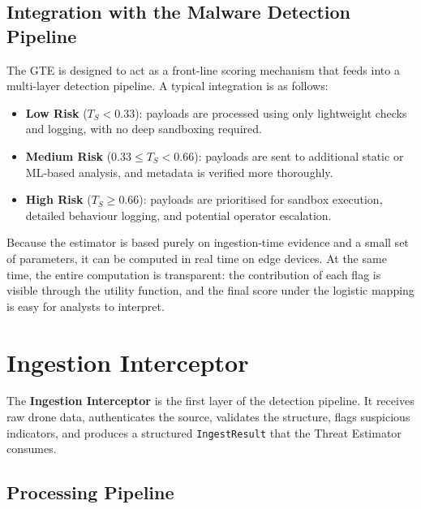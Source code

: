 \documentclass[12pt, a4paper]{report}
\begin{document}
\section{Integration with the Malware Detection Pipeline}

The GTE is designed to act as a front-line scoring mechanism that feeds into
a multi-layer detection pipeline. A typical integration is as follows:

\begin{itemize}
    \item \textbf{Low Risk} ($T_S < 0.33$):  
          payloads are processed using only lightweight checks and logging,
          with no deep sandboxing required.

    \item \textbf{Medium Risk} ($0.33 \leq T_S < 0.66$):  
          payloads are sent to additional static or ML-based analysis, and
          metadata is verified more thoroughly.

    \item \textbf{High Risk} ($T_S \geq 0.66$):  
          payloads are prioritised for sandbox execution, detailed behaviour
          logging, and potential operator escalation.
\end{itemize}

Because the estimator is based purely on ingestion-time evidence and a small
set of parameters, it can be computed in real time on edge devices. At the
same time, the entire computation is transparent: the contribution of each
flag is visible through the utility function, and the final score under the
logistic mapping is easy for analysts to interpret.

\cleardoublepage

\chapter{Ingestion Interceptor}
\label{chap:ingestion_interceptor}

The \textbf{Ingestion Interceptor} is the first layer of the detection pipeline.
It receives raw drone data, authenticates the source, validates the structure,
flags suspicious indicators, and produces a structured \texttt{IngestResult}
that the Threat Estimator consumes.

\section{Processing Pipeline}
\end{document}
